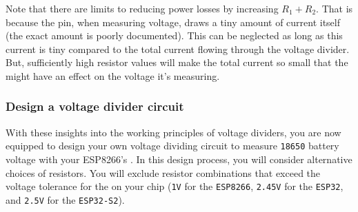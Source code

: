 Note that there are limits to reducing power losses by increasing $R_1+R_2$.
That is because the \adc pin, when measuring voltage, draws a tiny amount of current itself (the exact amount is poorly documented).
This can be neglected as long as this current is tiny compared to the total current flowing through the voltage divider.
But, sufficiently high resistor values will make the total current so small that the \adc might have an effect on the voltage it's measuring.

\subsubsection{\howto Design a voltage divider circuit}
With these insights into the working principles of voltage dividers, you are now equipped to design your own voltage dividing circuit to measure \texttt{18650} battery voltage with your ESP8266's \adc.
In this design process, you will consider alternative choices of resistors.
You will exclude resistor combinations that exceed the voltage tolerance for the \adc on your chip (\texttt{1V} for the \texttt{ESP8266}, \texttt{2.45V} for the \texttt{ESP32}, and \texttt{2.5V} for the \texttt{ESP32-S2}).

